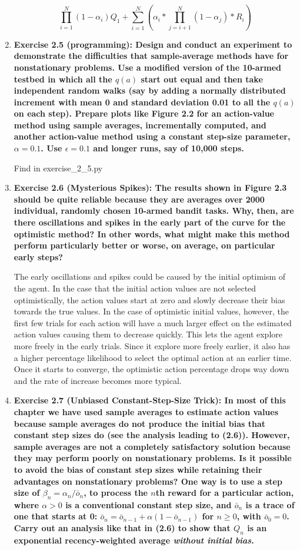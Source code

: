 \documentclass[11pt]{article}
\begin{document}
\begin{enumerate}
		$$\prod_{i=1}^N(1-\alpha_i)Q_1 + \sum_{i=1}^N(\alpha_i * \prod_{j=i+1}^N (1 - \alpha_j) * R_i)$$
		
		\item \textbf{Exercise 2.5 (programming): Design and conduct an experiment to demonstrate the difficulties that sample-average methods have for nonstationary problems. Use
		a modified version of the 10-armed testbed in which all the $q(a)$ start out equal and then take independent random walks (say by adding a normally distributed increment
		with mean 0 and standard deviation 0.01 to all the $q(a)$ on each step). Prepare plots like Figure 2.2 for an action-value method using sample averages, incrementally
		computed, and another action-value method using a constant step-size parameter, $\alpha=0.1$. Use $\epsilon=0.1$ and longer runs, say of 10,000 steps.}
		
		Find in exercise_2_5.py
		
		\item \textbf{Exercise 2.6 (Mysterious Spikes): The results shown in Figure 2.3 should be quite reliable because they are averages over 2000 individual, randomly chosen
		10-armed bandit tasks. Why, then, are there oscillations and spikes in the early part of the curve for the optimistic method? In other words, what might make this method
		perform particularly better or worse, on average, on particular early steps?}
		
		The early oscillations and spikes could be caused by the initial optimism of the agent. In the case that the initial action values are not selected optimistically, the
		action values start at zero and slowly decrease their bias towards the true values. In the case of optimistic initial values, however, the first few trials for each action
		will have a much larger effect on the estimated action values causing them to decrease quickly. This lets the agent explore more freely in the early trials. Since it
		explore more freely earlier, it also has a higher percentage likelihood to select the optimal action at an earlier time. Once it starts to converge, the optimistic action
		percentage drops way down and the rate of increase becomes more typical.
		
		\item \textbf{Exercise 2.7 (Unbiased Constant-Step-Size Trick): In most of this chapter we have used sample averages to estimate action values because sample averages do
		not produce the initial bias that constant step sizes do (see the analysis leading to (2.6)). However, sample averages are not a completely satisfactory solution because
		they may perform poorly on nonstationary problems. Is it possible to avoid the bias of constant step sizes while retaining their advantages on nonstationary problems? One
		way is to use a step size of $\beta_n=\alpha_n/\bar{o}_n$, to process the $n$th reward for a particular action, where $\alpha>0$ is a conventional constant step size, and
		$\bar{o}_n$ is a trace of one that starts at 0: $\bar{o}_n=\bar{o}_{n-1}+\alpha(1-\bar{o}_{n-1})$ for $n\geq0$, with $\bar{o}_0=0$. Carry out an analysis like that in
		(2.6) to show that $Q_n$ is an exponential recency-weighted average \textit{without initial bias}.}
		

\end{enumerate}
\end{document}

